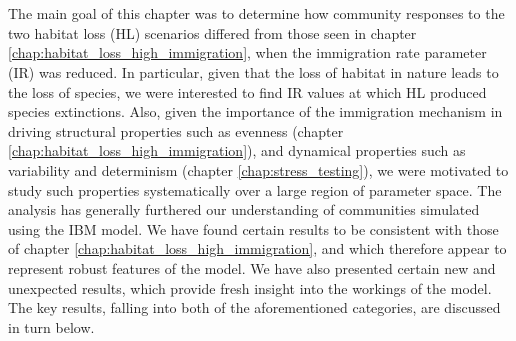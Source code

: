 %

\section{}
\label{sec:vir_discussion}


 The main goal of this chapter was to determine how community responses to the two habitat loss (HL) scenarios differed from those seen in chapter \ref{chap:habitat_loss_high_immigration}, when the immigration rate parameter (IR) was reduced. In particular, given that the loss of habitat in nature leads to the loss of species, we were interested to find IR values at which HL produced species extinctions. Also, given the importance of the immigration mechanism in driving structural properties such as evenness (chapter \ref{chap:habitat_loss_high_immigration}), and dynamical properties such as variability and determinism (chapter \ref{chap:stress_testing}), we were motivated to study such properties systematically over a large region of parameter space. The analysis has generally furthered our understanding of communities simulated using the IBM model. We have found certain results to be consistent with those of chapter \ref{chap:habitat_loss_high_immigration}, and which therefore appear to represent robust features of the model. We have also presented certain new and unexpected results, which provide fresh insight into the workings of the model. The key results, falling into both of the aforementioned categories, are discussed in turn below. 


